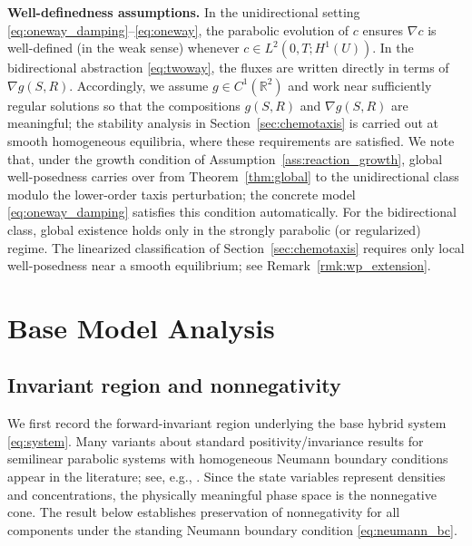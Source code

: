 \documentclass[pdflatex,sn-mathphys-ay]{sn-jnl}
\theoremstyle{thmstyleone}
\theoremstyle{definition}
\theoremstyle{remark}
\begin{document}
\medskip
\noindent\textbf{Well-definedness assumptions.}
In the unidirectional setting \eqref{eq:oneway_damping}--\eqref{eq:oneway}, the parabolic evolution of $c$ ensures $\nabla c$ is well-defined (in the weak sense) whenever $c\in L^2(0,T;H^1(U))$.
In the bidirectional abstraction \eqref{eq:twoway}, the fluxes are written directly in terms of $\nabla g(S,R)$. 
Accordingly, we assume $g\in C^1(\mathbb{R}^2)$ and work near sufficiently regular solutions so that the compositions $g(S,R)$ and $\nabla g(S,R)$ are meaningful; the stability analysis in Section~\ref{sec:chemotaxis} is carried out at smooth homogeneous equilibria, where these requirements are satisfied.
We note that, under the growth condition of Assumption~\ref{ass:reaction_growth},
global well-posedness carries over from Theorem~\ref{thm:global} to the
unidirectional class modulo the lower-order taxis perturbation; the concrete
model \eqref{eq:oneway_damping} satisfies this condition automatically. For the
bidirectional class, global existence holds only in the strongly parabolic (or
regularized) regime. The linearized classification of
Section~\ref{sec:chemotaxis} requires only local well-posedness near a smooth
equilibrium; see Remark~\ref{rmk:wp_extension}.

\section{Base Model Analysis}\label{sec:base_analysis}
\subsection{Invariant region and nonnegativity}
\label{subsec:invariant_positivity}

We first record the forward-invariant region underlying the base hybrid system \eqref{eq:system}. Many variants about standard positivity/invariance results for semilinear parabolic systems with homogeneous Neumann boundary conditions appear in the literature; see, e.g., \citep{amann1995linear,smoller2012shock}.
Since the state variables represent densities and concentrations, the physically meaningful phase space is the nonnegative cone. 
The result below establishes preservation of nonnegativity for all components under the standing Neumann boundary condition \eqref{eq:neumann_bc}.
\end{document}
